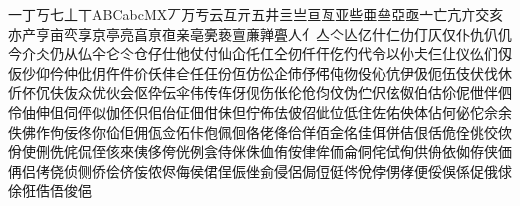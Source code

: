 一丁丂七丄丅ABCabcMX丆万亐云互亓五井亖亗亘亙亚些亜亝亞亟亠亡亢亣交亥亦产亨亩亪享京亭亮亯亰亱亲亳亴亵亶亷亸亹人亻亼亽亾亿什仁仂仃仄仅仆仇仈仉今介仌仍从仏仐仑仒仓仔仕他仗付仙仚仛仜仝仞仟仠仡仢代令以仦仧仨仩仪仫们仭仮仯仰仱仲仳仴仵件价仸仹仺任仼份仾仿伀企伂伃伄伅伆伇伈伉伊伋伌伍伎伏伐休伒伓伔伕伖众优伙会伛伜伝伞伟传伡伢伣伤伥伦伧伨伩伪伫伬伭伮伯估伱伲伳伴伵伶伷伸伹伺伻似伽伾伿佀佁佂佃佄佅但佇佈佉佊佋佌位低住佐佑佒体佔何佖佗佘余佚佛作佝佞佟你佡佢佣佤佥佦佧佨佩佪佫佬佭佮佯佰佱佲佳佴併佶佷佸佹佺佻佼佽佾使侀侁侂侃侄侅來侇侈侉侊例侌侍侎侏侐侑侒侓侔侕侖侗侘侙侚供侜依侞侟侠価侢侣侤侥侦侧侨侩侪侫侬侭侮侯侰侱侲侳侴侵侶侷侸侹侺侻侼侽侾便俀俁係促俄俅俆俇俈俉俊俋
